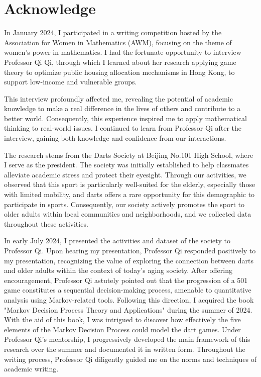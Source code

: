 \documentclass[cjjs]{ipart}
\theoremstyle{plain}
\begin{document}
\section*{\textbf{Acknowledge}}

\text In January 2024, I participated in a writing competition hosted by the Association for Women in Mathematics (AWM), focusing on the theme of women's power in mathematics. I had the fortunate opportunity to interview Professor Qi Qi, through which I learned about her research applying game theory to optimize public housing allocation mechanisms in Hong Kong, to support low-income and vulnerable groups.

This interview profoundly affected me, revealing the potential of academic knowledge to make a real difference in the lives of others and contribute to a better world. Consequently, this experience inspired me to apply mathematical thinking to real-world issues. I continued to learn from Professor Qi after the interview, gaining both knowledge and confidence from our interactions.

The research stems from the Darts Society at Beijing No.101 High School, where I serve as the president. The society was initially established to help classmates alleviate academic stress and protect their eyesight. Through our activities, we observed that this sport is particularly well-suited for the elderly, especially those with limited mobility, and darts offers a rare opportunity for this demographic to participate in sports.
Consequently, our society actively promotes the sport to older adults within local communities and neighborhoods, and we collected data throughout these activities.

In early July 2024, I presented the activities and dataset of the society to Professor Qi. Upon hearing my presentation, Professor Qi responded positively to my presentation, recognizing the value of exploring the connection between darts and older adults within the context of today's aging society. After offering encouragement, Professor Qi astutely pointed out that the progression of a 501 game constitutes a sequential decision-making process, amenable to quantitative analysis using Markov-related tools. Following this direction, I acquired the book "Markov Decision Process Theory and Applications" during the summer of 2024. With the aid of this book, I was intrigued to discover how effectively the five elements of the Markov Decision Process could model the dart games. Under Professor Qi’s mentorship, I progressively developed the main framework of this research over the summer and documented it in written form. Throughout the writing process, Professor Qi diligently guided me on the norms and techniques of academic writing.
\end{document}
